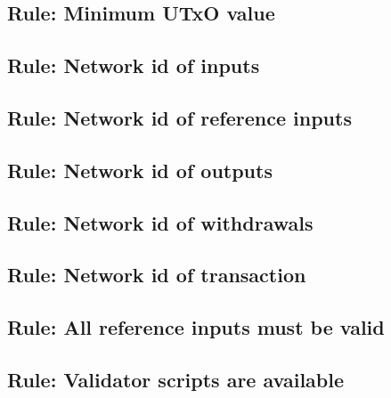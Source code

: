 \documentclass[../midgard.tex]{subfiles}
\begin{document}

\subsection{Rule: Minimum UTxO value}
\label{rule:minimum-utxo-value}

\subsection{Rule: Network id of inputs}
\label{rule:network-id-of-inputs}

\subsection{Rule: Network id of reference inputs}
\label{rule:network-id-of-reference-inputs}


\subsection{Rule: Network id of outputs}
\label{rule:network-id-of-outputs}

\subsection{Rule: Network id of withdrawals}
\label{rule:network-id-of-withdrawals}

\subsection{Rule: Network id of transaction}
\label{rule:network-id-of-transaction}

\subsection{Rule: All reference inputs must be valid}
\label{rule:all-reference-inputs-must-be-valid}


\subsection{Rule: Validator scripts are available}
\label{rule:validator-scripts-are-available}

\end{document}
